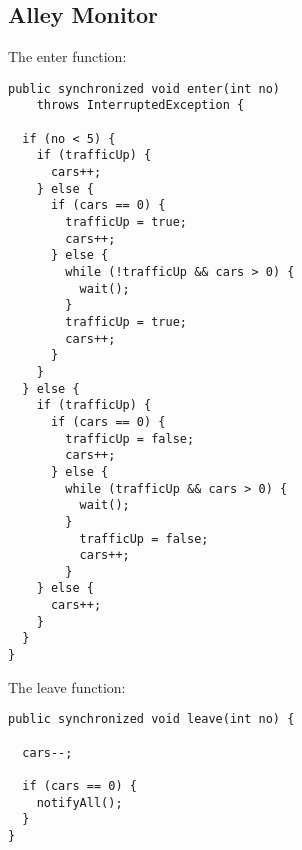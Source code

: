 \subsection{Alley Monitor}
\label{sec:alleymonitor}
The enter function:
\begin{lstlisting}
public synchronized void enter(int no) 
    throws InterruptedException {

  if (no < 5) {
    if (trafficUp) {
      cars++;
    } else {
      if (cars == 0) {
        trafficUp = true;
        cars++;
      } else {
        while (!trafficUp && cars > 0) {
          wait();
        }
        trafficUp = true;
        cars++;
      }
    }
  } else {
    if (trafficUp) {
      if (cars == 0) {
        trafficUp = false;
        cars++;
      } else {
        while (trafficUp && cars > 0) {
          wait();
        }
          trafficUp = false;
          cars++;
        }
    } else {
      cars++;
    }
  }
}
\end{lstlisting}
The leave function:
\begin{lstlisting}
public synchronized void leave(int no) {

  cars--;

  if (cars == 0) {
    notifyAll();
  }
}
\end{lstlisting}
